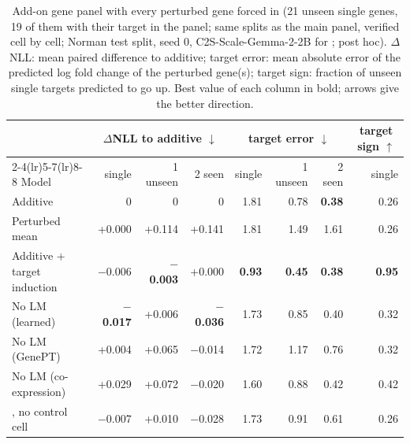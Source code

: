 \begin{table}[!htb]
\centering
\small
\setlength{\tabcolsep}{3pt}
\begin{tabular}{lrrrrrrr}
\toprule
 & \multicolumn{3}{c}{$\Delta$NLL to additive $\downarrow$} & \multicolumn{3}{c}{target error $\downarrow$} & \multicolumn{1}{c}{target sign $\uparrow$} \\
\cmidrule(lr){2-4}\cmidrule(lr){5-7}\cmidrule(lr){8-8}
Model & single & 1 unseen & 2 seen & single & 1 unseen & 2 seen & single \\
\midrule
Additive & 0 & 0 & 0 & 1.81 & 0.78 & \textbf{0.38} & 0.26 \\
Perturbed mean & +0.000 & +0.114 & +0.141 & 1.81 & 1.49 & 1.61 & 0.26 \\
Additive + target induction & $-$0.006 & \textbf{$-$0.003} & +0.000 & \textbf{0.93} & \textbf{0.45} & \textbf{0.38} & \textbf{0.95} \\
No LM (learned) & \textbf{$-$0.017} & +0.006 & \textbf{$-$0.036} & 1.73 & 0.85 & 0.40 & 0.32 \\
No LM (GenePT) & +0.004 & +0.065 & $-$0.014 & 1.72 & 1.17 & 0.76 & 0.32 \\
No LM (co-expression) & +0.029 & +0.072 & $-$0.020 & 1.60 & 0.88 & 0.42 & 0.42 \\
\rowcolor{ours}\cad{}, no control cell & $-$0.007 & +0.010 & $-$0.028 & 1.73 & 0.91 & 0.61 & 0.26 \\
\bottomrule
\end{tabular}
\caption{Add-on gene panel with every perturbed gene forced in (21 unseen single genes, 19 of them with their target in the panel; same splits as the main panel, verified cell by cell; Norman test split, seed 0, C2S-Scale-Gemma-2-2B for \cad{}; post hoc). $\Delta$NLL: mean paired difference to additive; target error: mean absolute error of the predicted log fold change of the perturbed gene(s); target sign: fraction of unseen single targets predicted to go up. Best value of each column in bold; arrows give the better direction.}
\label{tab:tp}
\end{table}
